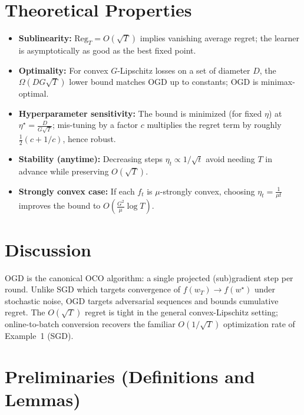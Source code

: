 \documentclass[11pt]{article}
\begin{document}
\section*{Theoretical Properties}

\begin{itemize}
  \item \textbf{Sublinearity:} $\mathrm{Reg}_T=O(\sqrt{T})$ implies vanishing average
        regret; the learner is asymptotically as good as the best fixed point.
  \item \textbf{Optimality:} For convex $G$-Lipschitz losses on a set of diameter $D$,
        the $\Omega(DG\sqrt{T})$ lower bound matches OGD up to constants;
        OGD is minimax-optimal.
  \item \textbf{Hyperparameter sensitivity:} The bound is minimized (for fixed $\eta$)
        at $\eta^\star = \frac{D}{G\sqrt{T}}$; mis-tuning by a factor $c$ multiplies the
        regret term by roughly $\tfrac12(c + 1/c)$, hence robust.
  \item \textbf{Stability (anytime):} Decreasing steps $\eta_t\propto 1/\sqrt{t}$ avoid
        needing $T$ in advance while preserving $O(\sqrt{T})$.
  \item \textbf{Strongly convex case:} If each $f_t$ is $\mu$-strongly convex, choosing
        $\eta_t=\frac{1}{\mu t}$ improves the bound to $O\!\left(\frac{G^2}{\mu}\log T\right)$.
\end{itemize}

\section*{Discussion}

OGD is the canonical OCO algorithm: a single projected (sub)gradient step per round.
Unlike SGD which targets convergence of $f(w_T)\to f(w^\star)$ under stochastic noise,
OGD targets adversarial sequences and bounds cumulative regret. The $O(\sqrt{T})$ regret
is tight in the general convex-Lipschitz setting; online-to-batch conversion recovers the
familiar $O(1/\sqrt{T})$ optimization rate of Example~1 (SGD).

\section*{Preliminaries (Definitions and Lemmas)}
\end{document}
